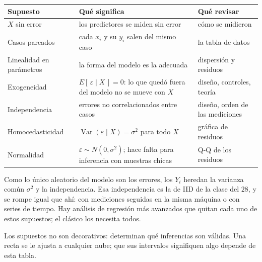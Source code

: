 \documentclass[11pt,letterpaper]{article}
\begin{document}
\begin{center}
\small
\begin{tabular}{>{\raggedright\arraybackslash}p{3.2cm}%
                >{\raggedright\arraybackslash}p{6.2cm}%
                >{\raggedright\arraybackslash}p{4.2cm}}
    \toprule
    \textbf{Supuesto} & \textbf{Qué significa} & \textbf{Qué revisar} \\
    \midrule
    $X$ sin error & los predictores se miden sin error
                  & cómo se midieron \\
    \addlinespace
    Casos pareados & cada $x_i$ y su $y_i$ salen del mismo caso
                   & la tabla de datos \\
    \addlinespace
    Linealidad en parámetros & la forma del modelo es la adecuada
                             & dispersión y residuos \\
    \addlinespace
    Exogeneidad & $E[\,\varepsilon \mid X\,] = 0$: lo que quedó fuera
                  del modelo no se mueve con $X$
                & diseño, controles, teoría \\
    \addlinespace
    Independencia & errores no correlacionados entre casos
                  & diseño, orden de las mediciones \\
    \addlinespace
    Homocedasticidad & $\operatorname{Var}(\varepsilon \mid X)
                        = \sigma^2$ para todo $X$
                     & gráfica de residuos \\
    \addlinespace
    Normalidad & $\varepsilon \sim N(0, \sigma^2)$; hace falta para
                 inferencia con muestras chicas
               & Q-Q de los residuos \\
    \bottomrule
\end{tabular}
\end{center}

Como lo único aleatorio del modelo son los errores, los $Y_i$ heredan
la varianza común $\sigma^2$ y la independencia. Esa independencia es
la de IID de la clase del $28$, y se rompe igual que ahí: con
mediciones seguidas en la misma máquina o con series de tiempo. Hay
análisis de regresión más avanzados que quitan cada uno de estos
supuestos; el clásico los necesita todos.

\begin{idea}
    Los supuestos no son decorativos: determinan qué inferencias son
    válidas. Una recta se le ajusta a cualquier nube; que sus
    intervalos signifiquen algo depende de esta tabla.
\end{idea}
\end{document}
